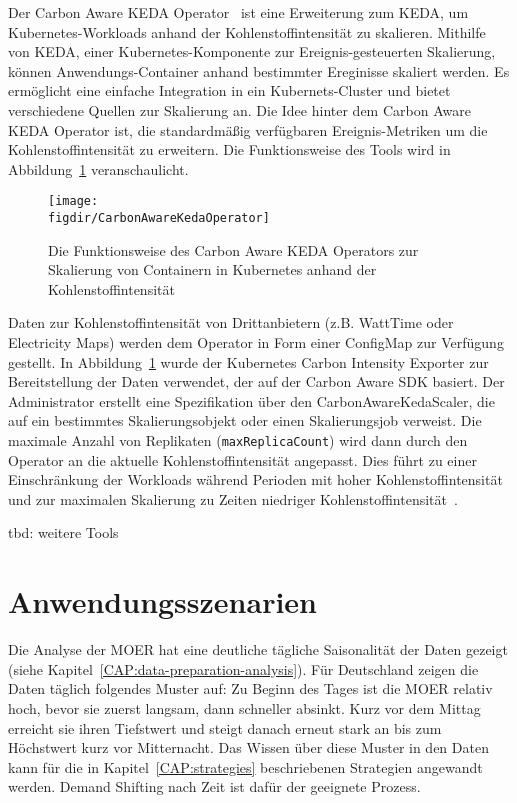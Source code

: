 Der Carbon Aware KEDA Operator~\cite{Azure.20240321T11:03:47.000Z} ist eine Erweiterung zum \ac{KEDA}, um Kubernetes-Workloads anhand der Kohlenstoffintensität zu skalieren.
Mithilfe von \ac{KEDA}, einer Kubernetes-Komponente zur Ereignis-gesteuerten Skalierung, können Anwendungs-Container anhand bestimmter Ereginisse skaliert werden.
Es ermöglicht eine einfache Integration in ein Kubernets-Cluster und bietet verschiedene Quellen zur Skalierung an.
Die Idee hinter dem Carbon Aware \ac{KEDA} Operator ist, die standardmäßig verfügbaren Ereignis-Metriken um die Kohlenstoffintensität zu erweitern.
Die Funktionsweise des Tools wird in Abbildung~\ref{FIG:carbon-aware-keda-operator} veranschaulicht.
\begin{figure}
 \caption{Die Funktionsweise des Carbon Aware KEDA Operators zur Skalierung von Containern in Kubernetes anhand der Kohlenstoffintensität~\cite{Azure.20240321T11:03:47.000Z}}
 {\texttt{[image: \\figdir/CarbonAwareKedaOperator]}}
 \label{FIG:carbon-aware-keda-operator}
\end{figure}
Daten zur Kohlenstoffintensität von Drittanbietern (z.B. WattTime oder Electricity Maps) werden dem Operator in Form einer ConfigMap zur Verfügung gestellt.
In Abbildung~\ref{FIG:carbon-aware-keda-operator} wurde der Kubernetes Carbon Intensity Exporter zur Bereitstellung der Daten verwendet, der auf der Carbon Aware \ac{SDK} basiert.
Der Administrator erstellt eine Spezifikation über den CarbonAwareKedaScaler, die auf ein bestimmtes Skalierungsobjekt oder einen Skalierungsjob verweist.
Die maximale Anzahl von Replikaten (\lstinline[columns=fixed]{maxReplicaCount}) wird dann durch den Operator an die aktuelle Kohlenstoffintensität angepasst.
Dies führt zu einer Einschränkung der Workloads während Perioden mit hoher Kohlenstoffintensität und zur maximalen Skalierung zu Zeiten niedriger Kohlenstoffintensität~\cite{Azure.20240321T11:03:47.000Z}.

tbd: weitere Tools

\section{Anwendungsszenarien}

Die Analyse der \ac{MOER} hat eine deutliche tägliche Saisonalität der Daten gezeigt (siehe Kapitel~\ref{CAP:data-preparation-analysis}).
Für Deutschland zeigen die Daten täglich folgendes Muster auf:
Zu Beginn des Tages ist die \ac{MOER} relativ hoch, bevor sie zuerst langsam, dann schneller absinkt.
Kurz vor dem Mittag erreicht sie ihren Tiefstwert und steigt danach erneut stark an bis zum Höchstwert kurz vor Mitternacht.
Das Wissen über diese Muster in den Daten kann für die in Kapitel~\ref{CAP:strategies} beschriebenen Strategien angewandt werden.
Demand Shifting nach Zeit ist dafür der geeignete Prozess.

